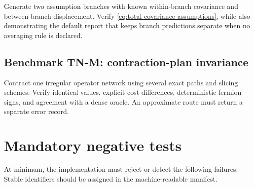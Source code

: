 \documentclass[11pt]{article}
\begin{document}
Generate two assumption branches with known within-branch covariance and
between-branch displacement.  Verify \cref{eq:total-covariance-assumptions},
while also demonstrating the default report that keeps branch predictions
separate when no averaging rule is declared.

\subsection{Benchmark TN-M: contraction-plan invariance}

Contract one irregular operator network using several exact paths and slicing
schemes.  Verify identical values, explicit cost differences, deterministic
fermion signs, and agreement with a dense oracle.  An approximate route must
return a separate error record.

\section{Mandatory negative tests}
\label{sec:negative-tests}

At minimum, the implementation must reject or detect the following failures.
Stable identifiers should be assigned in the machine-readable manifest.
\end{document}
